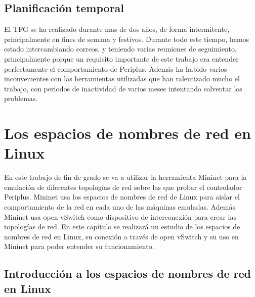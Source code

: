 \documentclass[a4paper, 12pt]{book}
\begin{document}
	
	\section{Planificación temporal}
	\label{sec:planificacion-temporal}
	
	El TFG se ha realizado durante mas de dos años, de forma intermitente, principalmente en fines de semana y festivos. Durante todo este tiempo, hemos estado intercambiando correos, y teniendo varias reuniones de seguimiento, principalmente porque un requisito importante de este trabajo era entender perfectamente el comportamiento de Periplus.
	Además ha habido varios inconvenientes con las herramientas utilizadas que han ralentizado mucho el trabajo, con periodos de inactividad de varios meses intentando solventar los problemas.
	
	
	
	\cleardoublepage
		
	
	\cleardoublepage %
	\chapter{Los espacios de nombres de red en Linux  } %
	\label{chap:mininet} %
	
	En este trabajo de fin de grado se va a utilizar la herramienta Mininet para la emulación de diferentes
	topologías de red sobre las que probar el controlador Periplus. Mininet usa los espacios de nombres
	de red de Linux para aislar el comportamiento de la red en cada uno de las máquinas emuladas. Además
	Mininet usa open vSwitch como dispositivo de interconexión para crear las topologías de red. En
	este capítulo se realizará un estudio de los espacios de nombres de red en Linux, su conexión
	a través de open vSwitch y su uso en Mininet para poder entender su funcionamiento.
	
	\section{Introducción a los espacios de nombres de red en Linux}
	
\end{document}
